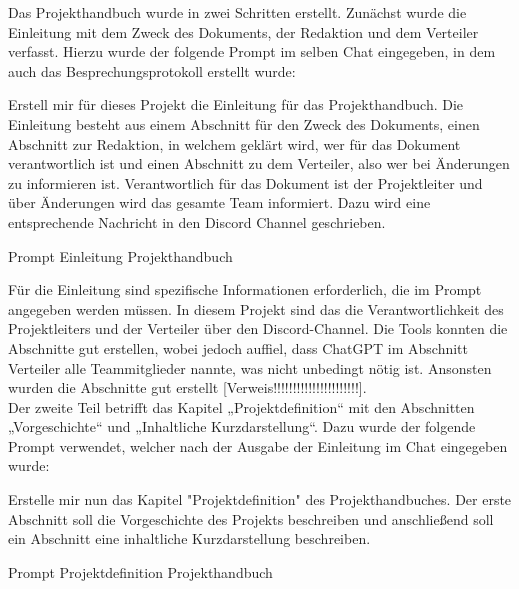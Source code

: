 Das Projekthandbuch wurde in zwei Schritten erstellt. Zunächst wurde die Einleitung mit dem Zweck des Dokuments, der Redaktion 
und dem Verteiler verfasst. Hierzu wurde der folgende Prompt im selben Chat eingegeben, in dem auch das Besprechungsprotokoll 
erstellt wurde:

\begin{prompt}[H]
    \begin{tcolorbox}[colback=gray!20, colframe=gray!20, boxrule=0pt, sharp corners] 
        Erstell mir für dieses Projekt die Einleitung für das Projekthandbuch. Die Einleitung besteht aus einem Abschnitt für 
        den Zweck des Dokuments, einen Abschnitt zur Redaktion, in welchem geklärt wird, wer für das Dokument verantwortlich ist 
        und einen Abschnitt zu dem Verteiler, also wer bei Änderungen zu informieren ist. Verantwortlich für das Dokument ist der 
        Projektleiter und über Änderungen wird das gesamte Team informiert. Dazu wird eine entsprechende Nachricht in den Discord 
        Channel geschrieben.
        \vfill
    \end{tcolorbox}
    \caption{Prompt Einleitung Projekthandbuch}
    \label{Prompt Einleitung Projekthandbuch}
\end{prompt}

Für die Einleitung sind spezifische Informationen erforderlich, die im Prompt angegeben werden müssen. In diesem Projekt sind das die 
Verantwortlichkeit des Projektleiters und der Verteiler über den Discord-Channel. Die Tools konnten die Abschnitte gut erstellen, wobei 
jedoch auffiel, dass ChatGPT im Abschnitt Verteiler alle Teammitglieder nannte, was nicht unbedingt nötig ist. Ansonsten wurden die 
Abschnitte gut erstellt [Verweis!!!!!!!!!!!!!!!!!!!!!!].\\

Der zweite Teil betrifft das Kapitel „Projektdefinition“ mit den Abschnitten „Vorgeschichte“ und „Inhaltliche Kurzdarstellung“. Dazu wurde 
der folgende Prompt verwendet, welcher nach der Ausgabe der Einleitung im Chat eingegeben wurde:

\begin{prompt}[H]
    \begin{tcolorbox}[colback=gray!20, colframe=gray!20, boxrule=0pt, sharp corners] 
        Erstelle mir nun das Kapitel "Projektdefinition" des Projekthandbuches. Der erste Abschnitt soll die Vorgeschichte des Projekts 
        beschreiben und anschließend soll ein Abschnitt eine inhaltliche Kurzdarstellung beschreiben.
        \vfill
    \end{tcolorbox}
    \caption{Prompt Projektdefinition Projekthandbuch}
    \label{Prompt Projektdefinition Projekthandbuch}
\end{prompt}

